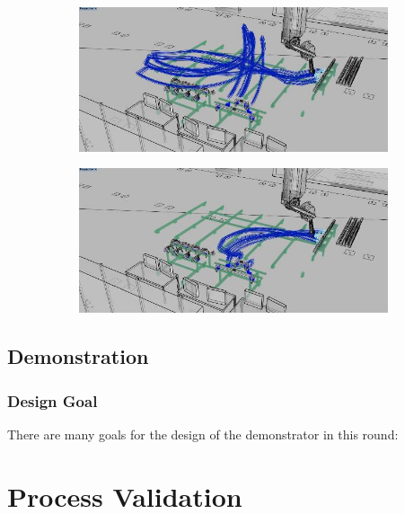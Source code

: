 \documentclass[11pt]{book}
\begin{document}
\begin{figure}[H]
\centering
\begin{subfigure}[b]{0.45\textwidth}
\centering
\includegraphics[width=\textwidth]{./images/image16.jpeg}
\end{subfigure}
\hfill
\begin{subfigure}[b]{0.45\textwidth}
\centering
\includegraphics[width=\textwidth]{./images/image17.jpeg}
\end{subfigure}
\end{figure}


\subsection{Demonstration}

\subsubsection{Design Goal}

There are many goals for the design of the demonstrator in this round:

\section{Process Validation}
\end{document}
